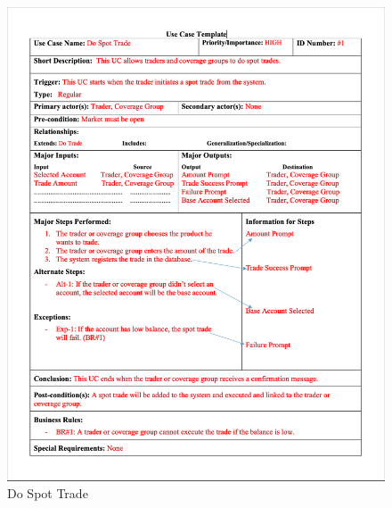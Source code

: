 \documentclass[a4paper]{report}
\begin{document}
\begin{figure}[h!]
    \centering
    \includegraphics[width=\textwidth]{images/uc/1-do-spot-trade.png}
    \caption{Do Spot Trade}
    \label{fig:1-do-spot-trade}
\end{figure}
\end{document}

